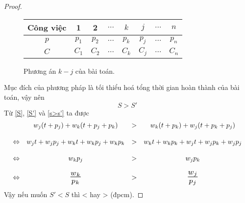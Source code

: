 \documentclass[12pt,a4paper]{report}
\begin{document}
\begin{proof}
	\begin{figure}[h!]
		\centering
		 \begin{tabular}{|c | c c c c c c c |} 
		 \hline
		 Công việc & 1 & 2 & $\ldots$ & $k$ & $j$ & $\ldots$ & $n$ \\
		 \hline\hline
		 $p$ & $p_1$ & $p_2$ & $\ldots$ & $p_k$ & $p_j$ & $\ldots$ & $p_n$ \\
		 $C$ & $C_1$ & $C_2$ & $\ldots$ & $C_k$ & $C_j$ & $\ldots$ & $C_n$ \\
		 \hline
		 \end{tabular}
	\caption{Phương án $k - j$ của bài toán.}
	\end{figure}

	Mục đích của phương pháp là tối thiểu hoá tổng thời gian hoàn thành của bài toán, vậy nên
	\begin{equation} \label{s>s'}
		S > S'
	\end{equation}
	Từ \eqref{S}, \eqref{S'} và \eqref{s>s'} ta được
        \begin{equation*}
        \begin{array}{c c c c}
		& w_j(t+p_j) + w_k(t+p_j+p_k) &>& w_k(t+p_k) + w_j(t+p_k+p_j) \\
		\\
		\Leftrightarrow & w_jt + w_jp_j + w_kt + w_k p_j + w_kp_k &>& w_k t + w_k p_k + w_j t + w_j p_k + w_j p_j \\
		\\
		\Leftrightarrow & w_k p_j &>& w_j p_k \\
		\\
		\Leftrightarrow & \scalebox{1.5}{$\frac{w_k}{p_k}$} &>& \scalebox{1.5}{$\frac{w_j}{p_j}$} \\
        \end{array}
        \end{equation*}
		Vậy nếu muốn $S'<S$ thì  <  hay  >  (đpcm).
\end{proof}
\end{document}
